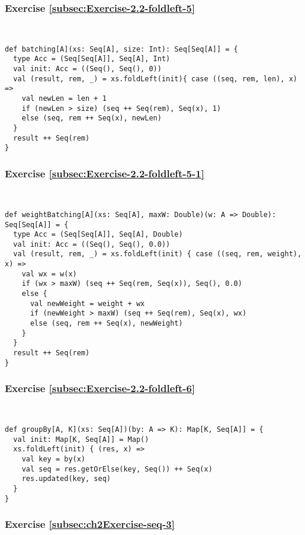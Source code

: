 \subsubsection*{Exercise \ref{subsec:Exercise-2.2-foldleft-5}}

~
\begin{lstlisting}
def batching[A](xs: Seq[A], size: Int): Seq[Seq[A]] = {  
  type Acc = (Seq[Seq[A]], Seq[A], Int)
  val init: Acc = ((Seq(), Seq(), 0))
  val (result, rem, _) = xs.foldLeft(init){ case ((seq, rem, len), x) =>
    val newLen = len + 1
    if (newLen > size) (seq ++ Seq(rem), Seq(x), 1)
    else (seq, rem ++ Seq(x), newLen)
  }
  result ++ Seq(rem)
}
\end{lstlisting}


\subsubsection*{Exercise \ref{subsec:Exercise-2.2-foldleft-5-1}}

~
\begin{lstlisting}
def weightBatching[A](xs: Seq[A], maxW: Double)(w: A => Double): Seq[Seq[A]] = {  
  type Acc = (Seq[Seq[A]], Seq[A], Double)
  val init: Acc = ((Seq(), Seq(), 0.0))
  val (result, rem, _) = xs.foldLeft(init) { case ((seq, rem, weight), x) =>
    val wx = w(x)
    if (wx > maxW) (seq ++ Seq(rem, Seq(x)), Seq(), 0.0)
    else {
      val newWeight = weight + wx
      if (newWeight > maxW) (seq ++ Seq(rem), Seq(x), wx)
      else (seq, rem ++ Seq(x), newWeight)
    }
  }
  result ++ Seq(rem)
}
\end{lstlisting}


\subsubsection*{Exercise \ref{subsec:Exercise-2.2-foldleft-6}}

~
\begin{lstlisting}
def groupBy[A, K](xs: Seq[A])(by: A => K): Map[K, Seq[A]] = {  
  val init: Map[K, Seq[A]] = Map()
  xs.foldLeft(init) { (res, x) =>
    val key = by(x)
    val seq = res.getOrElse(key, Seq()) ++ Seq(x)
    res.updated(key, seq)
  }
}
\end{lstlisting}


\subsubsection*{Exercise \ref{subsec:ch2Exercise-seq-3}}

